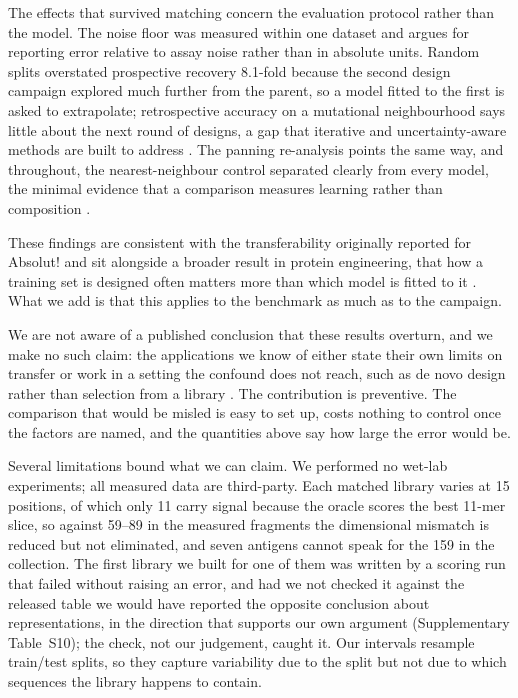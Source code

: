 \documentclass[pdflatex,sn-nature]{sn-jnl}
\theoremstyle{thmstyleone}
\theoremstyle{thmstyletwo}
\theoremstyle{thmstylethree}
\begin{document}
The effects that survived matching concern the evaluation protocol rather than
the model. The noise floor was measured within one dataset and argues for
reporting error relative to assay noise rather than in absolute units. Random
splits overstated prospective recovery 8.1-fold because the second design
campaign explored much further from the parent, so a model fitted to the first
is asked to extrapolate; retrospective accuracy on a mutational neighbourhood
says little about the next round of designs, a gap that iterative and
uncertainty-aware methods are built to address \cite{hie2020,settles2009}. The panning re-analysis points the same way, and throughout, the
nearest-neighbour control separated clearly from every model, the minimal
evidence that a comparison measures learning rather than composition
\cite{chuang2018}.

These findings are consistent with the transferability originally reported for
Absolut! \cite{robert2022} and sit alongside a broader result in protein
engineering, that how a training set is designed often matters more than which
model is fitted to it \cite{wittmann2021,biswas2021,yang2019}. What we add is
that this applies to the benchmark as much as to the campaign.

We are not aware of a published conclusion that these results overturn, and we
make no such claim: the applications we know of either state their own limits
on transfer or work in a setting the confound does not reach, such as de novo
design rather than selection from a library \cite{akbar2022,khan2023}. The
contribution is preventive. The comparison that would be misled is easy to set
up, costs nothing to control once the factors are named, and the quantities
above say how large the error would be.

Several limitations bound what we can claim. We performed no wet-lab
experiments; all measured data are third-party. Each matched library varies at
15 positions, of which only 11 carry signal because the oracle scores the best
11-mer slice, so against 59--89 in the measured fragments the dimensional
mismatch is reduced but not eliminated, and seven antigens cannot speak for the
159 in the collection. The first library we built for one of them was written
by a scoring run that failed without raising an error, and had we not checked
it against the released table we would have reported the opposite conclusion
about representations, in the direction that supports our own argument
(Supplementary Table~S10); the check, not our judgement, caught it. Our
intervals resample train/test splits, so they capture variability due to the
split but not due to which sequences the library happens to contain.
\end{document}
